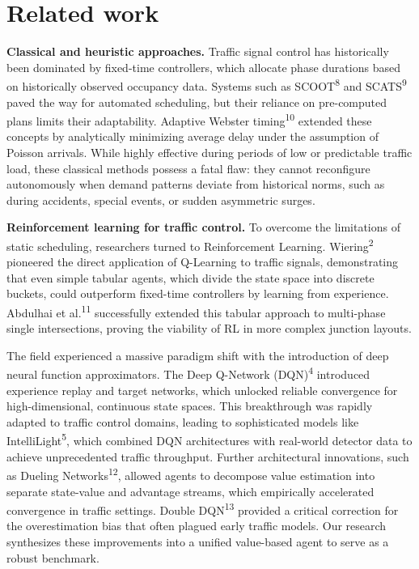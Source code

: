 \documentclass[10pt,a4paper]{article}
\begin{document}
\section{Related work}

\textbf{Classical and heuristic approaches.}
Traffic signal control has historically been dominated by fixed-time controllers, which allocate phase durations based on historically observed occupancy data. Systems such as SCOOT\textsuperscript{8} and SCATS\textsuperscript{9} paved the way for automated scheduling, but their reliance on pre-computed plans limits their adaptability. Adaptive Webster timing\textsuperscript{10} extended these concepts by analytically minimizing average delay under the assumption of Poisson arrivals. While highly effective during periods of low or predictable traffic load, these classical methods possess a fatal flaw: they cannot reconfigure autonomously when demand patterns deviate from historical norms, such as during accidents, special events, or sudden asymmetric surges.

\textbf{Reinforcement learning for traffic control.}
To overcome the limitations of static scheduling, researchers turned to Reinforcement Learning. Wiering\textsuperscript{2} pioneered the direct application of Q-Learning to traffic signals, demonstrating that even simple tabular agents, which divide the state space into discrete buckets, could outperform fixed-time controllers by learning from experience. Abdulhai et al.\textsuperscript{11} successfully extended this tabular approach to multi-phase single intersections, proving the viability of RL in more complex junction layouts.

The field experienced a massive paradigm shift with the introduction of deep neural function approximators. The Deep Q-Network (DQN)\textsuperscript{4} introduced experience replay and target networks, which unlocked reliable convergence for high-dimensional, continuous state spaces. This breakthrough was rapidly adapted to traffic control domains, leading to sophisticated models like IntelliLight\textsuperscript{5}, which combined DQN architectures with real-world detector data to achieve unprecedented traffic throughput. Further architectural innovations, such as Dueling Networks\textsuperscript{12}, allowed agents to decompose value estimation into separate state-value and advantage streams, which empirically accelerated convergence in traffic settings. Double DQN\textsuperscript{13} provided a critical correction for the overestimation bias that often plagued early traffic models. Our research synthesizes these improvements into a unified value-based agent to serve as a robust benchmark.
\end{document}
